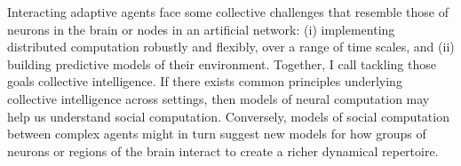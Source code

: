 \documentclass[]{article}
\begin{document}
Interacting adaptive agents face some collective challenges that resemble those of neurons in the brain or nodes in an artificial network: (i) implementing distributed computation robustly and flexibly, over a range of time scales, and (ii) building predictive models of their environment. Together, I call tackling those goals collective intelligence. If there exists common principles underlying collective intelligence across settings, then models of neural computation may help us understand social computation. Conversely, models of social computation between complex agents might in turn suggest new models for how groups of neurons or regions of the brain interact to create a richer dynamical repertoire.

\printbibliography[heading=bibintoc, title={References}]
\end{document}

